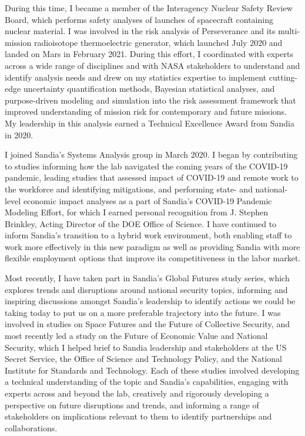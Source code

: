 \documentclass[10pt]{article}
\begin{document}
During this time, I became a member of the Interagency Nuclear Safety Review Board, which performs safety analyses of launches of spacecraft containing nuclear material. I was involved in the risk analysis of Perseverance and its multi-mission radioisotope thermoelectric generator, which launched July 2020 and landed on Mars in February 2021. During this effort, I coordinated with experts across a wide range of disciplines and with NASA stakeholders to understand and identify analysis needs and drew on my statistics expertise to implement cutting-edge uncertainty quantification methods, Bayesian statistical analyses, and purpose-driven modeling and simulation into the risk assessment framework that improved understanding of mission risk for contemporary and future missions. My leadership in this analysis earned a Technical Excellence Award from Sandia in 2020.

I joined Sandia's Systems Analysis group in March 2020. I began by contributing to studies informing how the lab navigated the coming years of the COVID-19 pandemic, leading studies that assessed impact of COVID-19 and remote work to the workforce and identifying mitigations, and performing state- and national-level economic impact analyses as a part of Sandia's COVID-19 Pandemic Modeling Effort, for which I earned personal recognition from J. Stephen Brinkley, Acting Director of the DOE Office of Science. I have continued to inform Sandia's transition to a hybrid work environment, both enabling staff to work more effectively in this new paradigm as well as providing Sandia with more flexible employment options that improve its competitiveness in the labor market.

Most recently, I have taken part in Sandia's Global Futures study series, which explores trends and disruptions around national security topics, informing and inspiring discussions amongst Sandia's leadership to identify actions we could be taking today to put us on a more preferable trajectory into the future. I was involved in studies on Space Futures and the Future of Collective Security, and most recently led a study on the Future of Economic Value and National Security, which I helped brief to Sandia leadership and stakeholders at the US Secret Service, the Office of Science and Technology Policy, and the National Institute for Standards and Technology. Each of these studies involved developing a technical understanding of the topic and Sandia's capabilities, engaging with experts across and beyond the lab, creatively and rigorously developing a perspective on future disruptions and trends, and informing a range of stakeholders on implications relevant to them to identify partnerships and collaborations.
\end{document}
